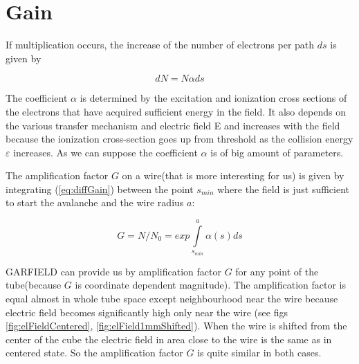 \documentclass[]{article}
\begin{document}
	\section{Gain}
	
	If multiplication occurs, the increase of the number of electrons per path $ds$ is given by
	
	\begin{equation}
		dN = N \alpha ds
		\label{eq:diffGain}
	\end{equation}
	
	The coefficient $\alpha$ is determined by the excitation and ionization cross sections of the electrons that have acquired sufficient energy in the field. It also depends on the various transfer mechanism and electric field E and increases with the field because the ionization cross-section goes up from threshold as the collision energy $\varepsilon$ increases. As we can suppose the coefficient $\alpha$ is of big amount of parameters.
	
	The amplification factor $G$ on a wire(that is more interesting for us) is given by integrating (\ref{eq:diffGain}) between the point $s_{min}$ where the field is just sufficient to start the avalanche and the wire radius $a$:
	
	\begin{equation}
	G = N/N_0 = exp \int\limits_{s_{min}}^{a} \alpha(s) ds
	\end{equation}
	
	GARFIELD can provide us by amplification factor $G$ for any point of the tube(because  $G$ is coordinate dependent magnitude). The amplification factor is equal almost in whole tube space except neighbourhood near the wire because electric field  becomes significantly high only near the wire (see figs \ref{fig:elFieldCentered}, \ref{fig:elField1mmShifted}). When the wire is shifted from the center of the cube the electric field in area close to the wire is the same as in centered state. So the amplification factor $G$ is quite similar in both cases.
	
\end{document}
